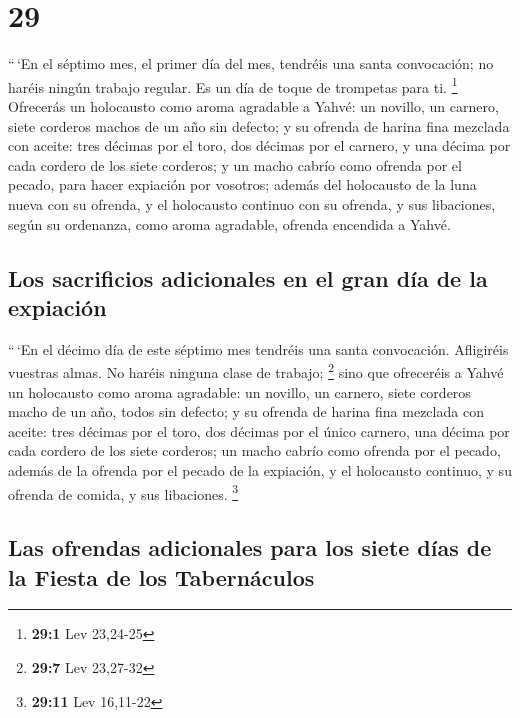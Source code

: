 \hypertarget{section-28}{%
\section{29}\label{section-28}}

 ``\,`En el séptimo mes, el primer día del mes, tendréis
una santa convocación; no haréis ningún trabajo regular. Es un día de
toque de trompetas para ti. \footnote{\textbf{29:1} Lev 23,24-25}
 Ofrecerás un holocausto como aroma agradable a Yahvé: un
novillo, un carnero, siete corderos machos de un año sin defecto;
 y su ofrenda de harina fina mezclada con aceite: tres
décimas por el toro, dos décimas por el carnero,  y una
décima por cada cordero de los siete corderos;  y un macho
cabrío como ofrenda por el pecado, para hacer expiación por vosotros;
 además del holocausto de la luna nueva con su ofrenda, y
el holocausto continuo con su ofrenda, y sus libaciones, según su
ordenanza, como aroma agradable, ofrenda encendida a Yahvé.

\hypertarget{los-sacrificios-adicionales-en-el-gran-duxeda-de-la-expiaciuxf3n}{%
\subsection{Los sacrificios adicionales en el gran día de la
expiación}\label{los-sacrificios-adicionales-en-el-gran-duxeda-de-la-expiaciuxf3n}}

 ``\,`En el décimo día de este séptimo mes tendréis una
santa convocación. Afligiréis vuestras almas. No haréis ninguna clase de
trabajo; \footnote{\textbf{29:7} Lev 23,27-32}  sino que
ofreceréis a Yahvé un holocausto como aroma agradable: un novillo, un
carnero, siete corderos macho de un año, todos sin defecto;
 y su ofrenda de harina fina mezclada con aceite: tres
décimas por el toro, dos décimas por el único carnero, 
una décima por cada cordero de los siete corderos;  un
macho cabrío como ofrenda por el pecado, además de la ofrenda por el
pecado de la expiación, y el holocausto continuo, y su ofrenda de
comida, y sus libaciones. \footnote{\textbf{29:11} Lev 16,11-22}

\hypertarget{las-ofrendas-adicionales-para-los-siete-duxedas-de-la-fiesta-de-los-tabernuxe1culos}{%
\subsection{Las ofrendas adicionales para los siete días de la Fiesta de
los
Tabernáculos}\label{las-ofrendas-adicionales-para-los-siete-duxedas-de-la-fiesta-de-los-tabernuxe1culos}}

